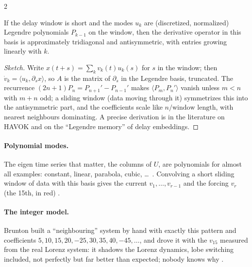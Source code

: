 \begin{paracol}{2}
\begin{proposition}\label{prop:hv-legendre}
If the delay window is short and the modes $u_k$ are (discretized, normalized) Legendre polynomials $P_{k-1}$ on the window, then
the derivative operator in this basis is approximately tridiagonal and antisymmetric, with entries growing linearly with $k$.
\end{proposition}
\begin{proof}[Sketch]
Write $x(t+s)=\sum_kv_k(t)u_k(s)$ for $s$ in the window; then $\dot v_k=\langle u_k,\partial_s x\rangle$, so $A$ is the matrix of
$\partial_s$ in the Legendre basis, truncated. The recurrence $(2n+1)P_n=P_{n+1}'-P_{n-1}'$ makes $\langle P_m,P_n'\rangle$ vanish
unless $m<n$ with $m+n$ odd; a sliding window (data moving through it) symmetrizes this into the antisymmetric part, and the
coefficients scale like $n/\text{window length}$, with nearest neighbours dominating. A precise derivation is in the
literature on HAVOK and on the ``Legendre memory'' of delay embeddings.
\end{proof}

\paragraph{Polynomial modes.} The eigen time series that matter, the columns of $U$, are polynomials for almost all examples:
constant, linear, parabola, cubic, \dots\ . Convolving a short sliding window of data with this
basis gives the current $v_1,\dots,v_{r-1}$ and the forcing $v_r$ (the 15th, in red) .

\paragraph{The integer model.} Brunton built a ``neighbouring'' system by hand with exactly this pattern and coefficients
$5,10,15,20,-25,30,35,40,-45,\dots$, and drove it with the $v_{15}$ measured from the real Lorenz system: it shadows the Lorenz
dynamics, lobe switching included, not perfectly but far better than expected; nobody knows why
.


\end{paracol}
